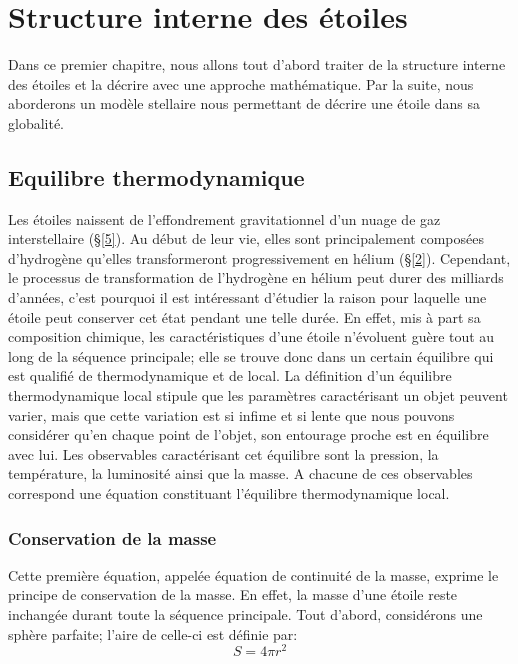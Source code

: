 


\chapter{Structure interne des étoiles}\label{1}
Dans ce premier chapitre, nous allons tout d'abord traiter de la structure interne des étoiles et la décrire avec une approche mathématique. Par la suite, nous aborderons un modèle stellaire nous permettant de décrire une étoile dans sa globalité.

\section{Equilibre thermodynamique}\label{1.1}

Les étoiles naissent de l'effondrement gravitationnel d'un nuage de gaz interstellaire (§\ref{5}). Au début de leur vie, elles sont principalement composées d'hydrogène qu'elles transformeront progressivement en hélium (§\ref{2}). Cependant, le processus de transformation de l'hydrogène en hélium peut durer des milliards d'années, c'est pourquoi il est intéressant d'étudier la raison pour laquelle une étoile peut conserver cet état pendant une telle durée. En effet, mis à part sa composition chimique, les caractéristiques d'une étoile n'évoluent guère tout au long de la séquence principale\footnotemark[1]; elle se trouve donc dans un certain équilibre qui est qualifié de thermodynamique et de local. La définition d'un équilibre thermodynamique local stipule que les paramètres caractérisant un objet peuvent varier, mais que cette variation est si infime et si lente que nous pouvons considérer qu'en chaque point de l'objet, son entourage proche est en équilibre avec lui. Les observables caractérisant cet équilibre sont la pression, la température, la luminosité ainsi que la masse. A chacune de ces observables correspond une équation constituant l'équilibre thermodynamique local.

\subsection{Conservation de la masse}\label{1.1.1}
Cette première équation, appelée équation de continuité de la masse, exprime le principe de conservation de la masse. En effet, la masse d'une étoile reste inchangée durant toute la séquence principale.\smallskip\newline
Tout d'abord, considérons une sphère parfaite\footnotemark[2]; l'aire de celle-ci est définie par:\begin{equation} S=4\pi r^{2}\label{Eq. 1.1}\end{equation}

